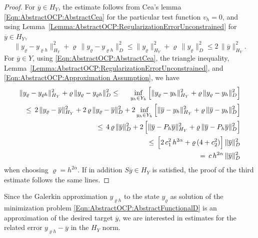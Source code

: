 \documentclass{article}
\numberwithin{equation}{section}
\begin{document}
\begin{proof}
  For $\overline{y} \in H_Y$, the estimate follows from
  Cea's lemma \eqref{Eqn:AbstractOCP:AbstractCea}
  for the particular test function $v_h=0$, and using
  Lemma~\ref{Lemma:AbstractOCP:RegularizationErrorUnconstrained}
  for $\overline{y} \in H_Y$,
  \[
    \| y_\varrho - y_{\varrho h} \|_{H_Y}^2 + \varrho \,
    \| y_\varrho - y_{\varrho h} \|_D^2
    \leq
    \| y_\varrho \|^2_{H_Y} + \varrho \, \| y_\varrho \|_D^2 \leq
    2 \, \| \overline{y} \|_{H_Y}^2 .
  \]
  For $\overline{y} \in Y$, using \eqref{Eqn:AbstractOCP:AbstractCea},
  the triangle inequality, 
  Lemma~\ref{Lemma:AbstractOCP:RegularizationErrorUnconstrained},
  and \eqref{Eqn:AbstractOCP:Approximation Assumption}, we have
  \begin{eqnarray*}
    \| y_\varrho - y_{\varrho h} \|^2_{H_Y}
    + \varrho \, \| y_\varrho - y_{\varrho h} \|^2_D
    & \leq & \inf\limits_{y_h \in Y_h} \Big[
             \| y_\varrho - y_h \|^2_{H_Y}
             + \varrho \, \| y_\varrho - y_h \|^2_D \Big] \\
    && \hspace*{-5cm}
       \leq \, 2 \, \| y_\varrho - \overline{y} \|^2_{H_Y} +
       2 \, \varrho \, \| y_\varrho - \overline{y} \|_D^2 +
       2 \inf\limits_{y_h \in Y_h} \Big[
       \| \overline{y} - y_h \|^2_{H_Y}
       + \varrho \, \| \overline{y} - y_h \|^2_D \Big] \\
    && \hspace*{-5cm}
       \leq \, 
       4 \, \varrho \, \| \overline{y} \|_D^2 +
       2 \, \Big[
       \| \overline{y} - P_h \overline{y} \|^2_{H_Y}
       + \varrho \, \| \overline{y} - P_h \overline{y} \|^2_D \Big] \\
    && \hspace*{-5cm}
       \leq \, \Big[ 2 \, c_1^2 \, h^{2\alpha} 
       + \varrho \, (4+c_2^2) \Big] \, \| \overline{y} \|_D^2 \\
    && \hspace*{-5cm} = \, c \, h^{2\alpha} \, \| \overline{y} \|_D^2 
  \end{eqnarray*}
  when choosing $\varrho = h^{2\alpha}$.
  If in addition $S \overline{y} \in H_Y$ is satisfied, the proof of the
  third estimate follows the same lines.
\end{proof}

\noindent
Since the Galerkin approximation $y_{\varrho h}$ to the state $y_\varrho$ as 
solution of the minimization problem
\eqref{Eqn:AbstractOCP:AbstractFunctionalD} is an approximation of the
desired target $\overline{y}$, we are interested in estimates for the
related error $y_{\varrho h}-\overline{y}$ in the $H_Y$ norm. 
\end{document}
